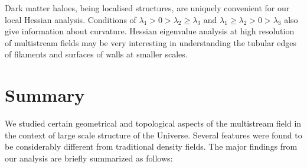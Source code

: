 Dark matter haloes, being localised structures, are uniquely convenient for our local Hessian analysis. Conditions of $\lambda_1 > 0 > \lambda_2 \geq \lambda_3 $ and $\lambda_1 \geq \lambda_2 > 0 > \lambda_3 $ also give information about curvature. Hessian eigenvalue analysis at high resolution of multistream fields may be very interesting in understanding the tubular edges of filaments and surfaces of walls at smaller scales. 

\section{Summary}
\label{sec:summary}

We studied certain geometrical and topological aspects of the multistream field in the context of large scale structure of the Universe. Several features were found to be considerably different from traditional density fields. The major findings from our analysis are briefly summarized as follows: 

